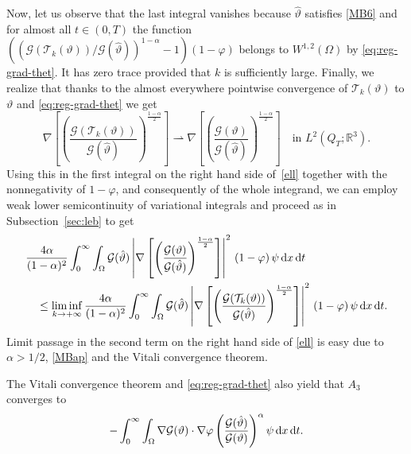 \documentclass[11pt, a4paper, reqno]{amsart}
\newcommand{\R}{{\mathbb R}}
\numberwithin{equation}{section}
\newcommand{\thetah}{\hat\thet}
\newcommand{\thet}{\vartheta}
\newcommand{\dt}{\,{\rm d} t }
\newcommand{\dx}{\,{\rm d} {x}}
\newcommand{\G}{\mathcal{G}}
\newcommand{\al}{\alpha}
\newcommand{\QT}{Q_T}
\newcommand{\intnO}[1]{\int_0^{\infty}\intO{ #1 }\dt}
\newcommand{\intO}[1]{\int_{\Omega} #1 \dx}
\begin{document}
Now, let us observe that the last integral vanishes because $\thetah$ satisfies \eqref{MB6} and for almost all $t\in (0,T)$ the function $(( \G(\mathcal{T}_k(\thet))/\G(\thetah))^{1-\alpha}-1)(1-\varphi)$ belongs to $W^{1,2}(\Omega)$ by \eqref{eq:reg-grad-thet}. It has zero trace provided that $k$ is sufficiently large.
%
Finally, we realize that thanks to the almost everywhere  pointwise convergence  of $\mathcal{T}_k(\thet)$ to $\thet$ and \eqref{eq:reg-grad-thet} we get
$$
\nabla\left[\left(\frac{\G(\mathcal{T}_k(\thet))}{\G(\thetah)}\right)^{\frac{1-\al}{2}}\right]\rightharpoonup
\nabla\left[\left(\frac{\G(\thet)}{\G(\thetah)}\right)^{\frac{1-\al}{2}}\right]\quad\mbox{in $L^2(\QT;\R^3)$.}
$$
Using this in the first integral on the right hand side of~\eqref{ell}  together with the nonnegativity of $1- \varphi$, and consequently of the whole integrand, we can employ weak lower semicontinuity of variational integrals and proceed as in Subsection~\ref{sec:leb} to get
\begin{equation*}
\begin{split}
&\frac{4\al}{(1-\al)^2}\intnO{ \G(\thetah) \left|\nabla\left[\left(\frac{\G(\thet)}{\G(\thetah)}\right)^{\frac{1-\al}{2}}\right]\right|^2 \,(1-\varphi)\,\psi}\\
&\quad \leq \liminf_{k\to +\infty}\frac{4\al}{(1-\al)^2}\intnO{ \G(\thetah) \left|\nabla\left[\left(\frac{\G(\mathcal{T}_k(\thet))}{\G(\thetah)}\right)^{\frac{1-\al}{2}}\right]\right|^2 \,(1-\varphi)\,\psi}.
\end{split}
\end{equation*}
Limit passage in the second term on the right hand side of \eqref{ell} is easy due to $\alpha>1/2$, \eqref{MBap} and the Vitali convergence theorem. 

The Vitali convergence  theorem and \eqref{eq:reg-grad-thet} also yield that $A_3$ converges to 
$$ -\intnO{\nabla \G(\thet)\cdot \nabla\varphi  \left(\frac{\G(\thetah)}{\G(\thet)}\right)^{\al} \psi}.$$
\end{document}

